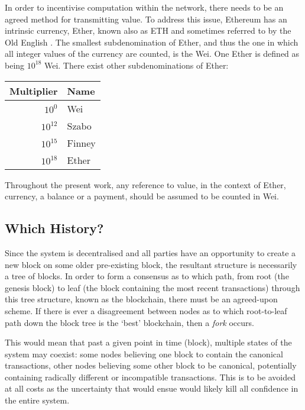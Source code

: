 \documentclass[9pt,oneside]{amsart}
\begin{document}
\begin{multicols}{2}
In order to incentivise computation within the network, there needs to be an agreed method for transmitting value. To address this issue, Ethereum has an intrinsic currency, Ether, known also as {\small ETH} and sometimes referred to by the Old English \DH{}. The smallest subdenomination of Ether, and thus the one in which all integer values of the currency are counted, is the Wei. One Ether is defined as being $10^{18}$ Wei. There exist other subdenominations of Ether:
\par
\begin{center}
\begin{tabular}{rl}
\toprule
Multiplier & Name \\
\midrule
$10^0$ & Wei \\
$10^{12}$ & Szabo \\
$10^{15}$ & Finney \\
$10^{18}$ & Ether \\
\bottomrule
\end{tabular}
\end{center}
\par

Throughout the present work, any reference to value, in the context of Ether, currency, a balance or a payment, should be assumed to be counted in Wei.

\subsection{Which History?}

Since the system is decentralised and all parties have an opportunity to create a new block on some older pre-existing block, the resultant structure is necessarily a tree of blocks. In order to form a consensus as to which path, from root (the genesis block) to leaf (the block containing the most recent transactions) through this tree structure, known as the blockchain, there must be an agreed-upon scheme. If there is ever a disagreement between nodes as to which root-to-leaf path down the block tree is the `best' blockchain, then a \textit{fork} occurs.

This would mean that past a given point in time (block), multiple states of the system may coexist: some nodes believing one block to contain the canonical transactions, other nodes believing some other block to be canonical, potentially containing radically different or incompatible transactions. This is to be avoided at all costs as the uncertainty that would ensue would likely kill all confidence in the entire system.


\end{multicols}
\end{document}
